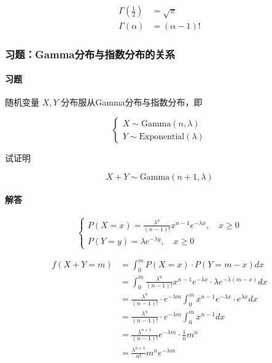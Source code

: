 \documentclass[a4paper, 11pt]{article} %
\begin{document}
\begin{align*}
\Gamma(\frac{1}{2}) &= \sqrt{\pi} \\
\Gamma(\alpha) &= (\alpha-1)!
\end{align*}

\subsubsection{习题：Gamma分布与指数分布的关系}

\paragraph{习题}

随机变量 $X, Y$ 分布服从Gamma分布与指数分布，即 

\begin{equation*}
\begin{cases}
X\sim\text{Gamma}(n,\lambda)\\
Y\sim\text{Exponential}(\lambda)
\end{cases}
\end{equation*}

试证明 

\begin{equation*}
X+Y\sim\text{Gamma}(n+1,\lambda)
\end{equation*}

\paragraph{解答}

\begin{equation*}
\begin{cases}
P(X=x)=\frac{\lambda^n}{(n-1)!}x^{n-1}e^{-\lambda x}, \quad x\ge0 \\
P(Y=y)=\lambda e^{-\lambda y}, \quad x\ge 0
\end{cases}
\end{equation*}

\begin{align*}
f(X+Y=m)&=\int_0^mP(X=x)\cdot P(Y=m-x)dx \\
&=\int_0^m\frac{\lambda^n}{(n-1)!}x^{n-1}e^{-\lambda x}\cdot\lambda e^{-\lambda (m-x)}dx \\
&=\frac{\lambda^n}{(n-1)!}\cdot e^{-\lambda m}\int_0^m x^{n-1}e^{-\lambda x}\cdot e^{\lambda x}dx \\
&=\frac{\lambda^n}{(n-1)!}\cdot e^{-\lambda m}\int_0^m x^{n-1}dx \\
&=\frac{\lambda^{n+1}}{(n-1)!}e^{-\lambda m}\cdot \frac{1}{n}m^n \\
&=\frac{\lambda^{n+1}}{n!}m^ne^{-\lambda m}
\end{align*}
\end{document}
